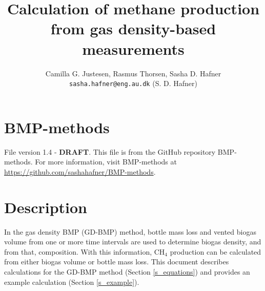 \documentclass[]{article}
\title {Calculation of methane production from gas density-based measurements}
\author{Camilla G. Justesen, Rasmus Thorsen, Sasha D. Hafner
\\
\texttt{sasha.hafner@eng.au.dk} (S. D. Hafner)\\
}
\begin{document}
\maketitle

\section{BMP-methods}
File version 1.4 - \textbf{DRAFT}. 
This file is from the GitHub repository BMP-methods.
For more information, visit BMP-methods at \url{https://github.com/sashahafner/BMP-methods}.

\section{Description}
In the gas density BMP (GD-BMP) method, bottle mass loss and vented biogas volume from one or more time intervals are used to determine biogas density, and from that, composition. 
With this information, CH$_4$ production can be calculated from either biogas volume or bottle mass loss.
This document describes calculations for the GD-BMP method (Section \ref{s_equations}) and provides an example calculation (Section \ref{s_example}).
\end{document}
